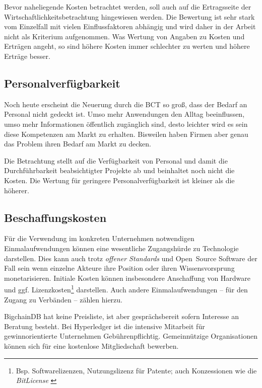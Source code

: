 Bevor naheliegende Kosten betrachtet werden, soll auch auf die Ertragsseite der Wirtschaftlichkeitsbetrachtung hingewiesen werden.
Die Bewertung ist sehr stark vom Einzelfall mit vielen Einflussfaktoren abhängig und wird daher in der Arbeit nicht als Kriterium aufgenommen.
Was Wertung von Angaben zu Kosten und Erträgen angeht, so sind höhere Kosten immer schlechter zu werten und höhere Erträge besser.

\subsection{Personalverfügbarkeit}\label{krit:personal}

Noch heute erscheint die Neuerung durch die \gls{BCT} so groß, dass der Bedarf an Personal nicht gedeckt ist.
Umso mehr Anwendungen den Alltag beeinflussen, umso mehr Informationen öffentlich zugänglich sind, desto leichter wird es sein diese Kompetenzen am Markt zu erhalten.
Bisweilen haben Firmen aber genau das Problem ihren Bedarf am Markt zu decken.

Die Betrachtung stellt auf die Verfügbarkeit von Personal und damit die Durchführbarkeit beabsichtigter Projekte ab und beinhaltet noch nicht die Kosten. 
Die Wertung für geringere Personalverfügbarkeit ist kleiner als die höherer.

\subsection{Beschaffungskosten}\label{kosten}

Für die Verwendung im konkreten Unternehmen notwendigen Einmalaufwendungen können eine wesentliche Zugangshürde zu Technologie darstellen.
Dies kann auch trotz \emph{offener Standards} und Open~Source Software der Fall sein wenn einzelne Akteure ihre Position oder ihren Wissensvorsprung monetarisieren.
Initiale Kosten können insbesondere Anschaffung von Hardware und ggf. Lizenzkosten\footnote{Bsp. Softwarelizenzen, Nutzungslizenz für Patente; auch Konzessionen wie die \emph{BitLicense} \autocite{w:bitlicense}} darstellen.
Auch andere Einmalaufwendungen -- \zB{} für den Zugang zu Verbänden -- zählen hierzu.

BigchainDB hat keine Preisliste, ist aber gesprächsbereit sofern Interesse an Beratung besteht.
Bei Hyperledger ist die intensive Mitarbeit für gewinnorientierte Unternehmen Gebührenpflichtig.
Gemeinnützige Organisationen können sich für eine kostenlose Mitgliedschaft bewerben.

